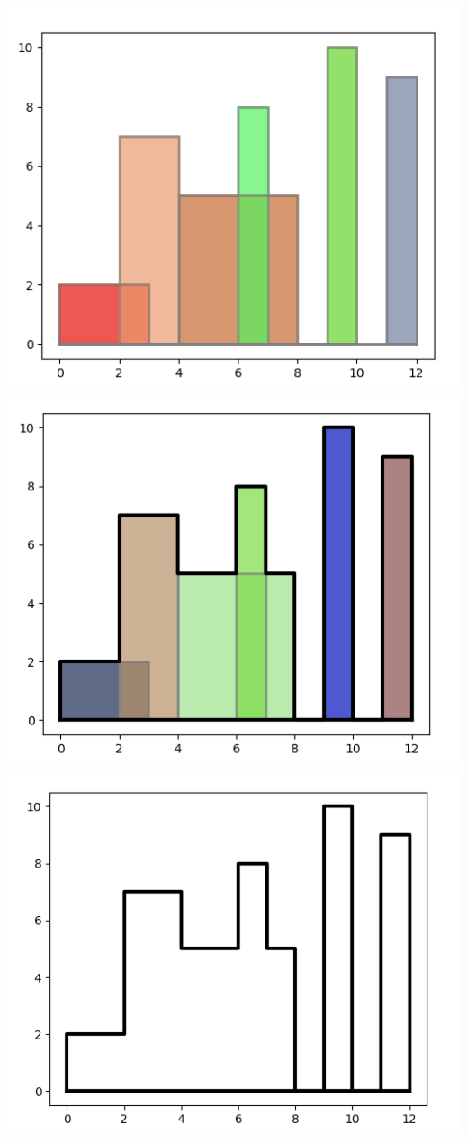 \documentclass[11pt,class=report,crop=false]{standalone}
\begin{document}
\begin{activite}[Skyline]
\begin{center}
	\includegraphics[scale=\myscale,scale=0.25]{ecran-skyline-4}\qquad
	\includegraphics[scale=\myscale,scale=0.25]{ecran-skyline-5}\qquad
	\includegraphics[scale=\myscale,scale=0.25]{ecran-skyline-6}

\end{center}
\end{activite}
\end{document}
